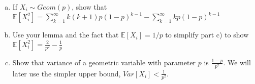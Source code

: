 \documentclass[11pt]{article}
\newif\ifsolutions
\begin{document}
\begin{enumerate}
\begin{enumerate}[a)]
\ifsolutions{\color{blue}{
\begin{align*}
\sum\nolimits_{k=0}^{\infty} (1-p)^k &= \frac{1}{p} &\text{take derivative of both sides twice} \\ 
-\sum\nolimits_{k=0}^{\infty} k(1-p)^{k-1} &= -\frac{1}{p^2}  &\text{1st}\\ 
\sum\nolimits_{k=0}^{\infty} k(k-1)(1-p)^{k-2} &= \frac{2}{p^3} &\text{2nd, LHS $k=0$ term is 0}\\ 
\sum\nolimits_{k=1}^{\infty} k(k-1)(1-p)^{k-2} &= \frac{2}{p^3} \\
\sum\nolimits_{j=0}^{\infty} (j+1)j(1-p)^{j-1} &= \frac{2}{p^3} 
&\text{change summation bounds} j = k-1 \\
\sum\nolimits_{j=1}^{\infty} j(j+1)(1-p)^{j-1} &= \frac{2}{p^3} &\text{LHS $j=0$ term is 0}
\end{align*}
}}\fi


\item If $X_i \sim Geom(p)$, show that $\mathbb{E}[X_i^2] = \sum\nolimits_{k=1}^{\infty} k(k+1)p(1-p)^{k-1} - \sum\nolimits_{k=1}^{\infty} kp(1-p)^{k-1}$

\ifsolutions{\color{blue}{
By definition $\mathbb{E}[X_i^2] = \sum\nolimits_{k=1}^{\infty} k^2p(1-p)^{k-1}$. Since $k^2 = k(k+1) - k$, we can plug that in to get the answer. 
}}\fi


\item Use your lemma and the fact that $\mathbb{E}[X_i] = 1/p$ to simplify part c) to show $\mathbb{E}[X_i^2] = \frac{2}{p^2} - \frac{1}{p} $

\ifsolutions{\color{blue}{
We simply plug in our lemma to the first sum term in part c). We also notice that the second sum term is just the expectation of a geometric variable with parameter $p$. So, we get 
\[ \mathbb{E}[X_i^2] = p\cdot \frac{2}{p^3} - \frac{1}{p} \]
}}\fi


\item Show that variance of a geometric variable with parameter $p$ is
  $\frac{1-p}{p^2}$. We will later use the simpler upper bound, $Var[X_i] < \frac{1}{p^2}$.

\ifsolutions{\color{blue}{
\begin{align*}
Var[X_i] &= \mathbb{E}[X_i^2] - \mathbb{E}[X_i]^2 \\ 
&= \frac{2}{p^2} - \frac{1}{p}  - (\frac{1}{p})^2 \\
&= \frac{1}{p^2} - \frac{1}{p} \\
&= \frac{1-p}{p^2} < \frac{1}{p^2}
\end{align*}
}}\fi



\end{enumerate}
\end{enumerate}
\end{document}
